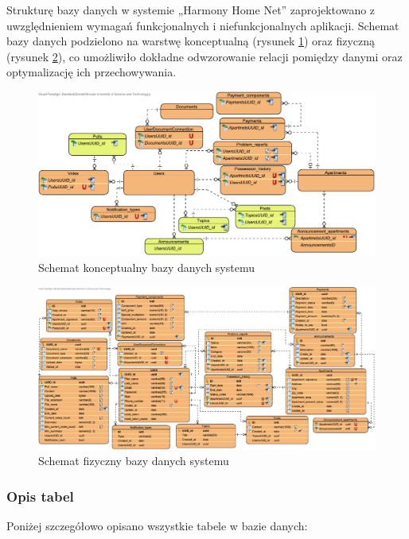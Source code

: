 Strukturę bazy danych w systemie „Harmony Home Net” zaprojektowano z uwzględnieniem wymagań funkcjonalnych i niefunkcjonalnych aplikacji. Schemat bazy danych podzielono na warstwę konceptualną (rysunek \ref{fig:ebok_db_concept}) oraz fizyczną (rysunek \ref{fig:ebok_db_physical}), co umożliwiło dokładne odwzorowanie relacji pomiędzy danymi oraz optymalizację ich przechowywania.
\begin{figure}[ht]
    \centering
    \includegraphics[width=.9\linewidth]{rys03/ebok_db_concept}
    \caption{Schemat konceptualny bazy danych systemu}
    \label{fig:ebok_db_concept}
\end{figure}
\begin{figure}[ht]
    \centering
    \includegraphics[width=1\linewidth]{rys03/ebok_db_physical}
    \caption{Schemat fizyczny bazy danych systemu}
    \label{fig:ebok_db_physical}
\end{figure}

\subsubsection{Opis tabel}
Poniżej szczegółowo opisano wszystkie tabele w bazie danych:

